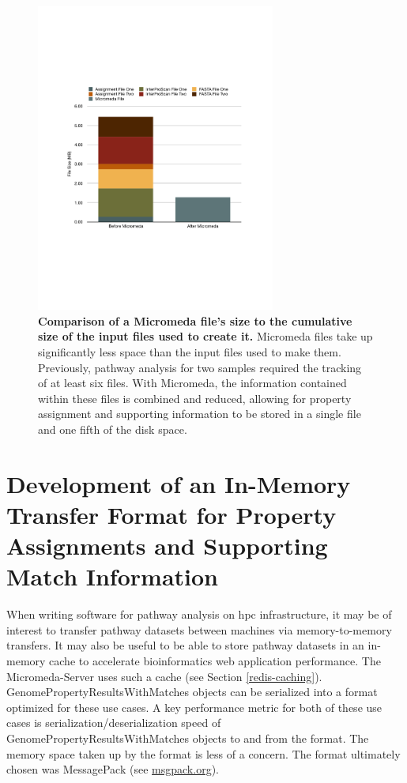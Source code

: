 \begin{figure}[!ht]
  \centering
	\includegraphics[width=0.70\textwidth]{media/micromeda_file_size.pdf}
	 \caption[Comparison of a Micromeda file's size to the cumulative size of the 
input files used to create it.]{\textbf{Comparison of a Micromeda file's size to 
the cumulative size of the input files used to create it.} Micromeda files take 
up significantly less space than the input files used to make them. Previously, 
pathway analysis for two samples required the tracking of at least six files. 
With Micromeda, the information contained within these files is combined and 
reduced, allowing for property assignment and supporting information to be 
stored in a single file and one fifth of the disk space.}
	 \label{fig:micromedafilesize}
\end{figure}

\FloatBarrier
\section{Development of an In-Memory Transfer Format for Property Assignments 
and Supporting Match Information} \label{msgpack}

When writing software for pathway analysis on \gls{hpc} infrastructure, it may 
be of interest to transfer pathway datasets between machines via 
memory-to-memory transfers. It may also be useful to be able to store pathway 
datasets in an in-memory cache to accelerate bioinformatics web application 
performance. The Micromeda-Server uses such a cache (see Section 
\ref{redis-caching}). GenomePropertyResultsWithMatches objects can be serialized 
into a format optimized for these use cases. A key performance metric for both 
of these use cases is serialization/deserialization speed of 
GenomePropertyResultsWithMatches objects to and from the format. The memory 
space taken up by the format is less of a concern. The format ultimately chosen 
was MessagePack  \cite{furuhashi2013messagepack}(see 
\href{http://msgpack.org}{msgpack.org}).

